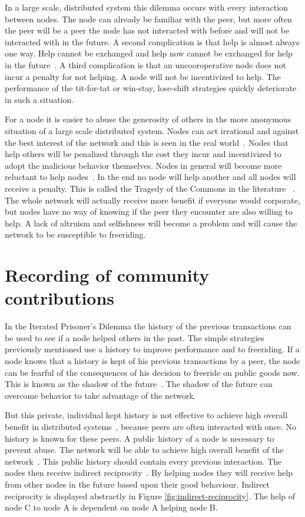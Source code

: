 In a large scale, distributed system this dilemma occurs with every interaction between nodes.
The node can already be familiar with the peer,
but more often the peer will be a peer the node has not interacted with before
and will not be interacted with in the future.
A second complication is that help is almost always one way.
Help cannot be exchanged and help now cannot be exchanged for help in the future~\cite{Lai-Incentives}.
A third complication is that an uncooroperative node does not incur a penalty for not helping.
A node will not be incentivized to help.
The performance of the tit-for-tat or win-stay, lose-shift strategies
quickly deteriorate in such a situation.

For a node it is easier to abuse the generosity of others in the more anonymous situation of a large scale distributed system.
Nodes can act irrational and against the best interest of the network
and this is seen in the real world~\cite{Adar-Freeriding}.
Nodes that help others will be penalized through the cost they incur
and incentivized to adopt the malicious behavior themselves.
Nodes in general will become more reluctant to help nodes~\cite{Nowak-PrisonerDilemma}.
In the end no node will help another and all nodes will receive a penalty.
This is called the Tragedy of the Commons in the literature ~\cite{Hardin-Tragedy}.
The whole network will actually receive more benefit if everyone would corporate,
but nodes have no way of knowing if the peer they encounter are also willing to help.
A lack of altruism and selfishness will become a problem 
and will cause the network to be susceptible to freeriding.

\section{Recording of community contributions}
In the Iterated Prisoner's Dilemma the history of the previous transactions can be used 
to see if a node helped others in the past.
The simple strategies previously mentioned use a history to improve performance
and to freeriding.
If a node knows that a history is kept of his previous transactions by a peer,
the node can be fearful of the consequences of his decision to freeride on public goods now.
This is known as the shadow of the future~\cite{bo-shadow}.
The shadow of the future can overcome behavior to take advantage of the network.

But this private, individual kept history is not effective
to achieve high overall benefit in distributed systems~\cite{Lai-Incentives},
because peers are often interacted with once.
No history is known for these peers.
A public history of a node is necessary to prevent abuse.
The network will be able to achieve high overall benefit of the network~\cite{Lai-Incentives}.
This public history should contain every previous interaction.
The nodes then receive indirect reciprocity~\cite{Nowak-Cooperation}.
By helping nodes they will receive help from other nodes in the future based upon their good behaviour.
Indirect reciprocity is displayed abstractly in Figure \ref{fig:indirect-reciprocity}.
The help of node C to node A is dependent on node A helping node B.

